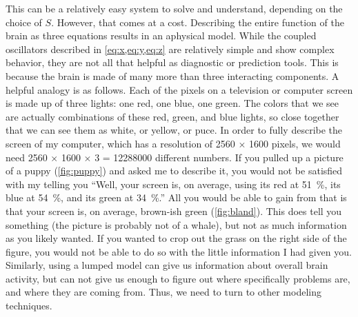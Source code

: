 This can be a relatively easy system to solve and understand, depending on the choice of $S$.
However, that comes at a cost.
Describing the entire function of the brain as three equations results in an aphysical model.
While the coupled oscillators described in \cref{eq:x,eq:y,eq:z} are relatively simple and show complex behavior, they are not all that helpful as diagnostic or prediction tools.
This is because the brain is made of many more than three interacting components.
A helpful analogy is as follows.
Each of the pixels on a television or computer screen is made up of three lights: one red, one blue, one green.
The colors that we see are actually combinations of these red, green, and blue lights, so close together that we can see them as white, or yellow, or puce.
In order to fully describe the screen of my computer, which has a resolution of 2560 $\times$ 1600 pixels, we would need 2560 $\times$ 1600 $\times$ 3 = 12288000 different numbers.
If you pulled up a picture of a puppy (\cref{fig:puppy}) and asked me to describe it, you would not be satisfied with my telling you ``Well, your screen is, on average, using its red at \SI{51}{\percent}, its blue at \SI{54}{\percent}, and its green at \SI{34}{\percent}.''
All you would be able to gain from that is that your screen is, on average, brown-ish green (\cref{fig:bland}).
This does tell you something (the picture is probably not of a whale), but not as much information as you likely wanted.
If you wanted to crop out the grass on the right side of the figure, you would not be able to do so with the little information I had given you.
Similarly, using a lumped model can give us information about overall brain activity, but can not give us enough to figure out where specifically problems are, and where they are coming from.
Thus, we need to turn to other modeling techniques.

